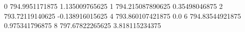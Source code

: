 0 794.9951171875 1.135009765625
1 794.215087890625 0.35498046875
2 793.72119140625 -0.138916015625
4 793.860107421875 0.0
6 794.83544921875 0.975341796875
8 797.67822265625 3.818115234375
